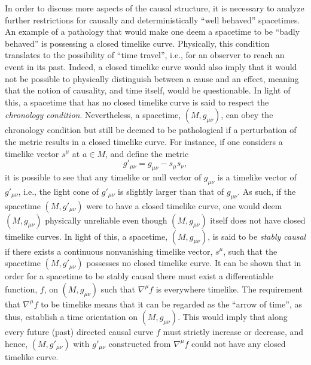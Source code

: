 \documentclass[
12pt,		%
openright,	%
twoside,  %
a4paper,			%
chapter=TITLE,		%
english,			%
french,				%
spanish,			%
brazil				%
]{USPSC-classe/USPSC}
\begin{document}
In order to discuss more aspects of the causal structure, it is necessary to analyze further restrictions for causally and deterministically ``well behaved'' spacetimes. An example of a pathology that would make one deem a spacetime to be ``badly behaved'' is possessing a closed timelike curve. Physically, this condition translates to the possibility of ``time travel'', i.e., for an observer to reach an event in its past. Indeed, a closed timelike curve would also imply that it would not be possible to physically distinguish between a cause and an effect, meaning that the notion of causality, and time itself, would be questionable. In light of this, a spacetime that has no closed timelike curve is said to respect the \textit{chronology condition}. Nevertheless, a spacetime, $(M,g_{\mu\nu})$, can obey the chronology condition but still be deemed to be pathological if a perturbation of the metric results in a closed timelike curve. For instance, if one considers a timelike vector $s^{\mu}$ at $a\in M$, and define the metric 
\begin{equation}
    g'_{\mu\nu}=g_{\mu\nu}-s_{\mu}s_{\nu},
\end{equation}
it is possible to see that any timelike or null vector of $g_{\mu\nu}$ is a timelike vector of $g'_{\mu\nu}$, i.e., the light cone of $g'_{\mu\nu}$ is slightly larger than that of $g_{\mu\nu}$. As such, if the spacetime $(M,g'_{\mu\nu})$ were to have a closed timelike curve, one would deem $(M,g_{\mu\nu})$ physically unreliable even though $(M,g_{\mu\nu})$ itself does not have closed timelike curves. In light of this, a spacetime, $(M,g_{\mu\nu})$, is said to be \textit{stably causal} if there exists a continuous nonvanishing timelike vector, $s^{\mu}$, such that the spacetime $(M,g'_{\mu\nu})$ possesses no closed timelike curve. It can be shown \cite{Hawking1973} that in order for a spacetime to be stably causal there must exist a differentiable function, $f$, on $(M,g_{\mu\nu})$ such that $\nabla^{\mu}f$ is everywhere timelike. The requirement that $\nabla^{\mu}f$ to be timelike means that it can be regarded as the “arrow of time”, as thus, establish a time orientation on $(M,g_{\mu\nu})$. This would imply that along every future (past) directed causal curve $f$ must strictly increase or decrease, and hence, $(M,g'_{\mu\nu})$ with $g'_{\mu\nu}$ constructed from $\nabla^{\mu}f$ could not have any closed timelike curve. 
\end{document}
